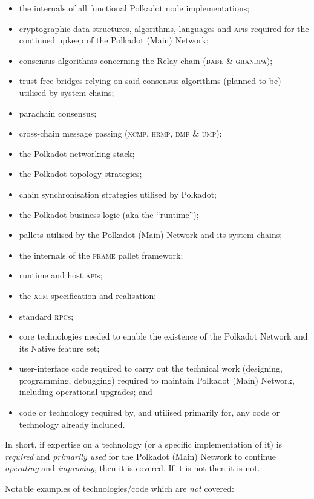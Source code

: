 \documentclass[9pt,oneside]{amsart}
\begin{document}
\begin{itemize}
 \item the internals of all functional Polkadot node implementations;
 \item cryptographic data-structures, algorithms, languages and \textsc{api}s required for the continued upkeep of the Polkadot (Main) Network;
 \item consensus algorithms concerning the Relay-chain (\textsc{babe} \& \textsc{grandpa});
 \item trust-free bridges relying on said consensus algorithms (planned to be) utilised by system chains;
 \item parachain consensus;
 \item cross-chain message passing (\textsc{xcmp}, \textsc{hrmp}, \textsc{dmp} \& \textsc{ump});
 \item the Polkadot networking stack;
 \item the Polkadot topology strategies;
 \item chain synchronisation strategies utilised by Polkadot;
 \item the Polkadot business-logic (aka the ``runtime'');
 \item pallets utilised by the Polkadot (Main) Network and its system chains;
 \item the internals of the \textsc{frame} pallet framework;
 \item runtime and host \textsc{api}s;
 \item the \textsc{xcm} specification and realisation;
 \item standard \textsc{rpc}s;
 \item core technologies needed to enable the existence of the Polkadot Network and its Native feature set;
 \item user-interface code required to carry out the technical work (designing, programming, debugging) required to maintain Polkadot (Main) Network, including operational upgrades; and
 \item code or technology required by, and utilised primarily for, any code or technology already included.
\end{itemize}

In short, if expertise on a technology (or a specific implementation of it) is \emph{required} and \emph{primarily used} for the Polkadot (Main) Network to continue \emph{operating} and \emph{improving}, then it is covered. If it is not then it is not.

Notable examples of technologies/code which are \emph{not} covered:
\end{document}
